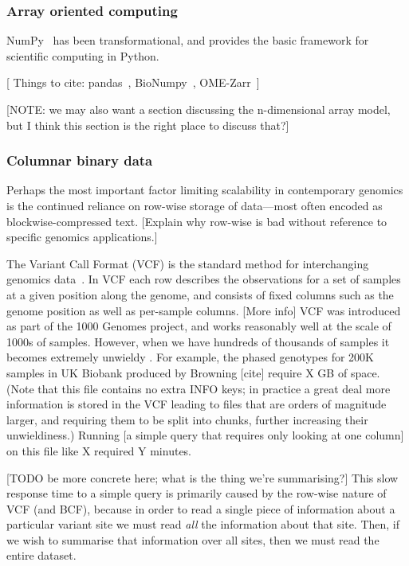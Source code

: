 \documentclass[a4paper,num-refs]{oup-contemporary}
\begin{document}
\subsubsection{Array oriented computing}

NumPy~\citep{harris2020array} has been transformational, and provides
the basic framework for scientific computing in Python.

[ Things to cite: pandas~\citep{mckinney2010data},
BioNumpy~\citep{rand2022bionumpy}, OME-Zarr~\citep{moore2023ome}]

[NOTE: we may also want a section discussing the n-dimensional array model,
but I think this section is the right place to discuss that?]

\subsubsection{Columnar binary data}

Perhaps the most important factor limiting scalability in contemporary genomics
is the continued reliance on row-wise storage of data---most often
encoded as blockwise-compressed text.
[Explain why row-wise is bad without reference to specific genomics applications.]

The Variant Call Format (VCF) is the standard method for interchanging
genomics data~\citep{danecek2011variant}.
In VCF each row describes the observations for a set of samples
at a given position along the genome, and consists of fixed columns such as the
genome position as well as per-sample columns. [More info]
VCF was introduced as part of the 1000 Genomes project, and works reasonably
well at the scale of 1000s of samples. However, when we have hundreds of
thousands of samples it becomes extremely unwieldy
. For example, the
phased genotypes for 200K samples in UK Biobank produced by Browning [cite]
require X GB of space.
(Note that this file contains no extra INFO keys; in practice a great deal
more information is stored in the VCF leading to files that are orders of
magnitude larger, and requiring them to be split into chunks, further
increasing their unwieldiness.)
Running [a simple query that requires only looking at
one column] on this file like X required Y minutes.

[TODO be more concrete here; what is the thing we're summarising?]
This slow response time to a simple query is primarily caused by the row-wise
nature of VCF (and BCF), because in order to read a single piece of
information about a particular variant site we must read \emph{all}
the information
about that site. Then, if we wish to summarise that information over
all sites, then we must read the entire dataset.
\end{document}
